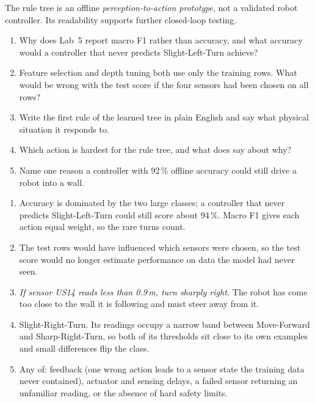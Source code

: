 The rule tree is an offline \emph{perception-to-action prototype}, not a validated robot controller. Its readability supports further closed-loop testing.



\begin{quickcheck}
\begin{enumerate}
  \item Why does Lab~5 report macro F1 rather than accuracy, and what accuracy would a controller that never predicts Slight-Left-Turn achieve?
  \item Feature selection and depth tuning both use only the training rows. What would be wrong with the test score if the four sensors had been chosen on all rows?
  \item Write the first rule of the learned tree in plain English and say what physical situation it responds to.
  \item Which action is hardest for the rule tree, and what does  say about why?
  \item Name one reason a controller with 92\,\% offline accuracy could still drive a robot into a wall.
\end{enumerate}
\end{quickcheck}

\begin{checkanswers}
\begin{enumerate}
  \item Accuracy is dominated by the two large classes; a controller that never predicts Slight-Left-Turn could still score about 94\,\%. Macro F1 gives each action equal weight, so the rare turns count.
  \item The test rows would have influenced which sensors were chosen, so the test score would no longer estimate performance on data the model had never seen.
  \item \emph{If sensor US14 reads less than 0.9\,m, turn sharply right.} The robot has come too close to the wall it is following and must steer away from it.
  \item Slight-Right-Turn. Its readings occupy a narrow band between Move-Forward and Sharp-Right-Turn, so both of its thresholds sit close to its own examples and small differences flip the class.
  \item Any of: feedback (one wrong action leads to a sensor state the training data never contained), actuator and sensing delays, a failed sensor returning an unfamiliar reading, or the absence of hard safety limits.
\end{enumerate}
\end{checkanswers}
